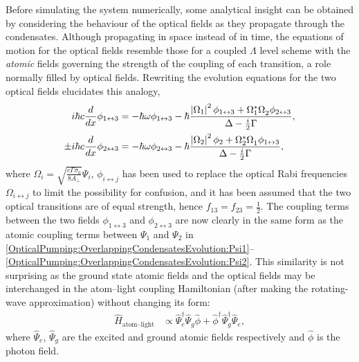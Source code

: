 Before simulating the system numerically, some analytical insight can be obtained by considering the behaviour of the optical fields as they propagate through the condensates.  Although propagating in space instead of in time, the equations of motion for the optical fields resemble those for a coupled $\Lambda$ level scheme with the \emph{atomic} fields governing the strength of the coupling of each transition, a role normally filled by optical fields.  Rewriting the evolution equations for the two optical fields elucidates this analogy,
\begin{subequations}
    \label{OpticalPumping:OpticalPropagationAnalogy}
    \begin{align}
        i \hbar c \frac{d}{dx} \phi_{1\leftrightarrow 3} &= -\hbar \omega \phi_{1\leftrightarrow 3}  - \hbar \frac{\abs{\Omega_1}^2 \phi_{1\leftrightarrow 3} + \Omega_1^* \Omega_2^{\phantom{*}} \phi_{2\leftrightarrow 3}}{\Delta - \frac{i}{2} \Gamma},\\
        \pm i \hbar c\frac{d}{dx} \phi_{2\leftrightarrow 3} &= - \hbar \omega \phi_{2\leftrightarrow 3} - \hbar \frac{\abs{\Omega_2}^2 \phi_2 + \Omega_2^* \Omega_1^{\phantom{*}} \phi_{1\leftrightarrow 3}}{\Delta - \frac{i}{2} \Gamma},
    \end{align}
\end{subequations}
where $\displaystyle\Omega_i = \sqrt{\frac{c \Gamma \sigma_0}{8 A_\perp}} \Psi_i$, $\phi_{i\leftrightarrow j}$ has been used to replace the optical Rabi frequencies $\Omega_{i \leftrightarrow j}$ to limit the possibility for confusion, and it has been assumed that the two optical transitions are of equal strength, hence $f_{13} = f_{23} = \frac{1}{2}$.  The coupling terms between the two fields $\phi_{1 \leftrightarrow 3}$ and $\phi_{2 \leftrightarrow 3}$ are now clearly in the same form as the atomic coupling terms between $\Psi_1$ and $\Psi_2$ in \eqref{OpticalPumping:OverlappingCondensatesEvolution:Psi1}--\eqref{OpticalPumping:OverlappingCondensatesEvolution:Psi2}.  This similarity is not surprising as the ground state atomic fields and the optical fields may be interchanged in the atom--light coupling Hamiltonian (after making the rotating-wave approximation) without changing its form:
\begin{align}
    \hat{H}_\text{atom--light} &\propto \hat{\Psi}_e^\dagger \hat{\Psi}_g^{\phantom{\dagger}} \hat{\phi} + \hat{\phi}^\dagger \hat{\Psi}_g^\dagger \hat{\Psi}_e^{\phantom{\dagger}},
\end{align}
where $\hat{\Psi}_e$, $\hat{\Psi}_g$ are the excited and ground atomic fields respectively and $\hat{\phi}$ is the photon field.

